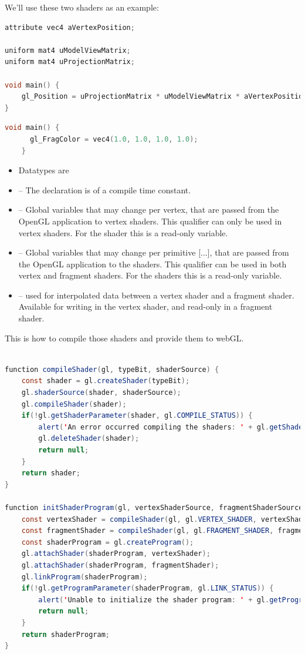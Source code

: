 We'll use these two shaders as an example: 

\begin{lstlisting}[language=c, caption=vertex-shader]
attribute vec4 aVertexPosition;

uniform mat4 uModelViewMatrix;
uniform mat4 uProjectionMatrix;

void main() {
    gl_Position = uProjectionMatrix * uModelViewMatrix * aVertexPosition;
}
\end{lstlisting}

\begin{lstlisting}[language=c, caption=pixel-shader]
    void main() {
      gl_FragColor = vec4(1.0, 1.0, 1.0, 1.0);
    }
\end{lstlisting}

\begin{itemize}
    \item Datatypes are 
    \item {} – The declaration is of a compile time constant.
    \item {} – Global variables that may change per vertex, that are passed from the OpenGL application to vertex shaders. This qualifier can only be used in vertex shaders. For the shader this is a read-only variable.
    \item {} – Global variables that may change per primitive [...], that are passed from the OpenGL application to the shaders. This qualifier can be used in both vertex and fragment shaders. For the shaders this is a read-only variable.
    \item {} – used for interpolated data between a vertex shader and a fragment shader. Available for writing in the vertex shader, and read-only in a fragment shader.
\end{itemize}

This is how to compile those shaders and provide them to webGL.

\begin{lstlisting}[language=java]

function compileShader(gl, typeBit, shaderSource) {
    const shader = gl.createShader(typeBit);
    gl.shaderSource(shader, shaderSource);
    gl.compileShader(shader);
    if(!gl.getShaderParameter(shader, gl.COMPILE_STATUS)) {
        alert('An error occurred compiling the shaders: ' + gl.getShaderInfoLog(shader));
        gl.deleteShader(shader);
        return null;
    }
    return shader;
}

function initShaderProgram(gl, vertexShaderSource, fragmentShaderSource) {
    const vertexShader = compileShader(gl, gl.VERTEX_SHADER, vertexShaderSource);
    const fragmentShader = compileShader(gl, gl.FRAGMENT_SHADER, fragmentShaderSource);
    const shaderProgram = gl.createProgram();
    gl.attachShader(shaderProgram, vertexShader);
    gl.attachShader(shaderProgram, fragmentShader);
    gl.linkProgram(shaderProgram);
    if(!gl.getProgramParameter(shaderProgram, gl.LINK_STATUS)) {
        alert('Unable to initialize the shader program: ' + gl.getProgramInfoLog(shaderProgram));
        return null;
    }
    return shaderProgram;
}
\end{lstlisting}

